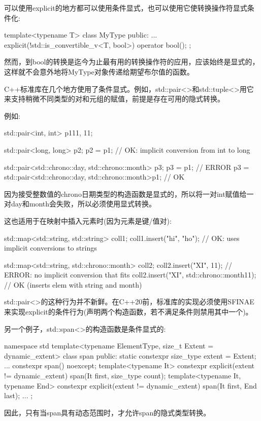 可以使用explicit的地方都可以使用条件显式，也可以使用它使转换操作符显式条件化:

\begin{cpp}
template<typename T>
class MyType {
	public:
	...
	explicit(!std::is_convertible_v<T, bool>) operator bool();
};
\end{cpp}

然而，到bool的转换是迄今为止最有用的转换操作符的应用，应该始终是显式的，这样就不会意外地将MyType对象传递给期望布尔值的函数。


C++标准库在几个地方使用了条件显式。例如，std::pair<>和std::tuple<>用它来支持稍微不同类型的对和元组的赋值，前提是存在可用的隐式转换。

例如:

\begin{cpp}
std::pair<int, int> p1{11, 11};

std::pair<long, long> p2{};
p2 = p1; // OK: implicit conversion from int to long

std::pair<std::chrono::day, std::chrono::month> p3{};
p3 = p1; // ERROR
p3 = std::pair<std::chrono::day, std::chrono::month>{p1}; // OK
\end{cpp}

因为接受整数值的chrono日期类型的构造函数是显式的，所以将一对int赋值给一对day和month会失败，所以必须使用显式转换。

这也适用于在映射中插入元素时(因为元素是键/值对):

\begin{cpp}
std::map<std::string, std::string> coll1;
coll1.insert({"hi", "ho"}); // OK: uses implicit conversions to strings

std::map<std::string, std::chrono::month> coll2;
coll2.insert({"XI", 11}); // ERROR: no implicit conversion that fits
coll2.insert({"XI", std::chrono::month{11}}); // OK (inserts elem with string and month)
\end{cpp}

std::pair<>的这种行为并不新鲜。在C++20前，标准库的实现必须使用SFINAE来实现explicit的条件行为(声明两个构造函数，若不满足条件则禁用其中一个)。

另一个例子，std::span<>的构造函数是条件显式的:

\begin{cpp}
namespace std {
	template<typename ElementType, size_t Extent = dynamic_extent>
	class span {
	public:
		static constexpr size_type extent = Extent;
		...
		constexpr span() noexcept;
		template<typename It>
			constexpr explicit(extent != dynamic_extent)
			span(It first, size_type count);
		template<typename It, typename End>
			constexpr explicit(extent != dynamic_extent)
			span(It first, End last);
		...
	};
}
\end{cpp}

因此，只有当span具有动态范围时，才允许span的隐式类型转换。











